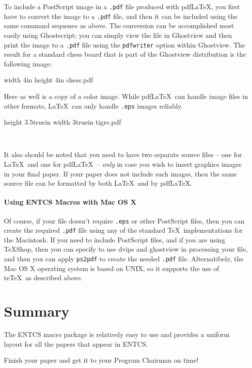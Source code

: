 \documentclass{entcs} \usepackage{entcsmacro}
\begin{document}
To include a PostScript image in a \texttt{.pdf} file produced
with pdf\LaTeX, you first have to convert the image to a
\texttt{.pdf} file, and then it can be included using the same
command sequence as above. The conversion can be accomplished
most easily using Ghostscript; you can simply view the file in
Ghostview and then print the image to a \texttt{.pdf} file using
the \verb+pdfwriter+ option within Ghostview. The result for a
standard chess board that is part of the Ghostview distribution
is the following image:

\centerline{\pdfximage width 4in height 4in
  {chess.pdf}\pdfrefximage\pdflastximage}
Here as well is a copy of a color image. While pdf\LaTeX\ can
handle image files in other formats, \LaTeX\ can only handle
\texttt{.eps} images reliably.

\centerline{\pdfximage height 3.5truein width 3truein
  {tigre.pdf}\pdfrefximage\pdflastximage}\ \medbreak

It also should be noted that you need to have two separate source
files -- one for \LaTeX\ and one for pdf\LaTeX\ -- \emph{only} in case
you wish to insert graphics images in your final paper. If your paper
does not include such images, then the same source file can be
formatted by both \LaTeX\ and by pdf\LaTeX.

\paragraph{Using ENTCS Macros with Mac OS X}
Of course, if your file doesn't require \texttt{.eps} or other
PostScript files, then you can create the required \texttt{.pdf} file
using any of the standard \TeX\ implementations for the Macintosh. If
you need to include PostScript files, and if you are using \TeX Shop,
then you can specify to use dvips and ghostview in processing your
file, and then you can apply \texttt{ps2pdf} to create the needed
\texttt{.pdf} file. Alternatibely, the Mac OS X operating system is
based on UNIX, so it supports the use of te\TeX\ as described above.

\section{Summary}  The ENTCS macro package is relatively easy to use
and provides a uniform layout for all the papers that appear in ENTCS.

\begin{problem}
  Finish your paper and get it to your Program Chairman on time!
\end{problem}
\end{document}
